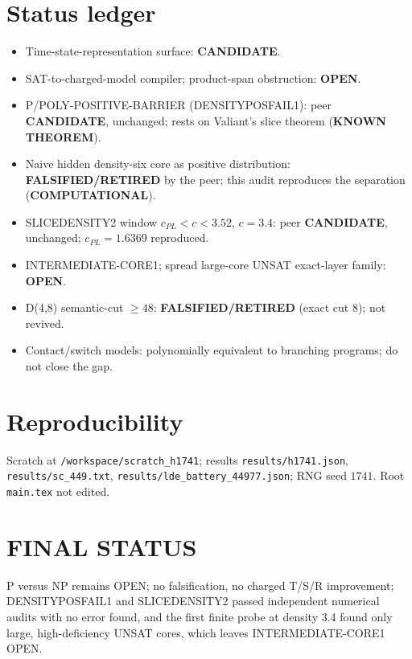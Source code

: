 \documentclass[11pt]{article}
\begin{document}
\section*{Status ledger}
\begin{itemize}
\item Time-state-representation surface: \textbf{CANDIDATE}.
\item SAT-to-charged-model compiler; product-span obstruction: \textbf{OPEN}.
\item P/POLY-POSITIVE-BARRIER (DENSITYPOSFAIL1): peer \textbf{CANDIDATE}, unchanged; rests on Valiant's slice theorem (\textbf{KNOWN THEOREM}).
\item Naive hidden density-six core as positive distribution: \textbf{FALSIFIED/RETIRED} by the peer; this audit reproduces the separation (\textbf{COMPUTATIONAL}).
\item SLICEDENSITY2 window $c_{PL}<c<3.52$, $c=3.4$: peer \textbf{CANDIDATE}, unchanged; $c_{PL}=1.6369$ reproduced.
\item INTERMEDIATE-CORE1; spread large-core UNSAT exact-layer family: \textbf{OPEN}.
\item D(4,8) semantic-cut $\ge48$: \textbf{FALSIFIED/RETIRED} (exact cut 8); not revived.
\item Contact/switch models: polynomially equivalent to branching programs; do not close the gap.
\end{itemize}

\section*{Reproducibility}
Scratch at \texttt{/workspace/scratch\_h1741}; results \texttt{results/h1741.json}, \texttt{results/sc\_449.txt}, \texttt{results/lde\_battery\_44977.json}; RNG seed $1741$. Root \texttt{main.tex} not edited.

\section*{FINAL STATUS}
P versus NP remains OPEN; no falsification, no charged T/S/R improvement; DENSITYPOSFAIL1 and SLICEDENSITY2 passed independent numerical audits with no error found, and the first finite probe at density 3.4 found only large, high-deficiency UNSAT cores, which leaves INTERMEDIATE-CORE1 OPEN.
\end{document}

